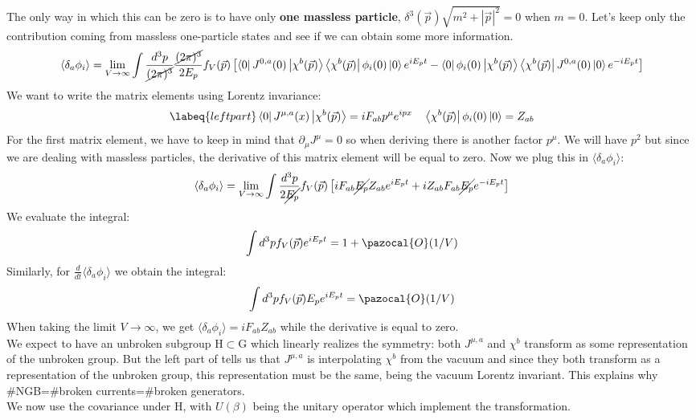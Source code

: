 \documentclass[../main.tex]{subfiles}
\begin{document}
The only way in which this can be zero is to have only \textbf{one massless particle}, $\delta^3(\Vec{p})\sqrt{m^2+|\Vec{p}|^2}=0$ when $m=0$. Let's keep only the contribution coming from massless one-particle states and see if we can obtain some more information.
\[
\langle\delta_a\phi_i\rangle=\lim_{V\to\infty}\int\frac{d^3p}{\cancel{(2\pi)^3}}\frac{\cancel{(2\pi)^3}}{2E_p}f_V(\Vec{p})\left[\bra{0}J^{0,a}(0)\ket{\chi^b(\Vec{p})}\bra{\chi^b(\Vec{p})}\phi_i(0)\ket{0}e^{iE_pt}-\bra{0}\phi_i(0)\ket{\chi^b(\Vec{p})}\bra{\chi^b(\Vec{p})}J^{0,a}(0)\ket{0}e^{-iE_pt}\right]
\]
We want to write the matrix elements using Lorentz invariance:
\begin{equation}
\labeq{leftpart}
\bra{0}J^{\mu,a}(x)\ket{\chi^b(\Vec{p})}=iF_{ab}p^\mu e^{ipx} \quad \bra{\chi^b(\Vec{p})}\phi_i(0)\ket{0}=Z_{ab}
\end{equation}
For the first matrix element, we have to keep in mind that $\partial_\mu J^\mu=0$ so when deriving there is another factor $p^\mu$. We will have $p^2$ but since we are dealing with massless particles, the derivative of this matrix element will be equal to zero. Now we plug this in $\langle\delta_a\phi_i\rangle$:
\[
\langle\delta_a\phi_i\rangle=\lim_{V\to\infty}\int\frac{d^3p}{2\cancel{E_p}}f_V(\Vec{p})\left[iF_{ab}\cancel{E_p}Z_{ab}e^{iE_pt}+iZ_{ab}F_{ab}\cancel{E_p}e^{-iE_pt}\right]
\]
We evaluate the integral:
\[
\int d^3pf_V(\Vec{p})e^{iE_pt}=1+\pazocal{O}(1/V)
\]
Similarly, for $\frac{d}{dt}\langle\delta_a\phi_i\rangle$ we obtain the integral:
\[
\int d^3pf_V(\Vec{p})E_pe^{iE_pt}=\pazocal{O}(1/V)
\]
When taking the limit $V\to\infty$, we get
$\langle\delta_a\phi_i\rangle=iF_{ab}Z_{ab}$ while the derivative is equal to zero.\\
We expect to have an unbroken subgroup H$\subset$G which linearly realizes the symmetry: both $J^{\mu,a}$ and $\chi^b$ transform as some representation of the unbroken group. But the left part of  tells us that $J^{\mu,a}$ is interpolating $\chi^b$ from the vacuum and since they both transform as a representation of the unbroken group, this representation must be the same, being the vacuum Lorentz invariant. This explains why\\
\#NGB=\#broken currents=\#broken generators.\\
We now use the covariance under H, with $U(\beta)$ being the unitary operator which implement the transformation.
\end{document}
